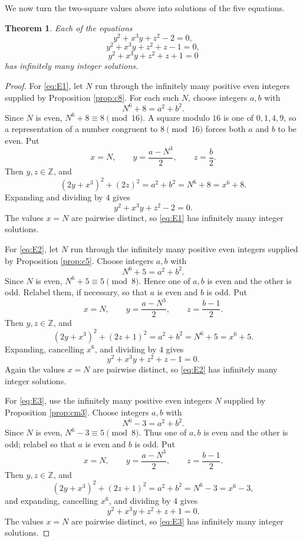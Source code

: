 \documentclass{article}
\theoremstyle{plain}
\theoremstyle{remark}
\theoremstyle{myconjecture}
\theoremstyle{plain}
\newtheorem{theorem}{Theorem}[section]
\theoremstyle{definition}
\numberwithin{equation}{section} %
\begin{document}
We now turn the two-square values above into solutions of the five equations.

\begin{theorem}\label{thm:first-three}
Each of the equations
\[
        y^2+x^3y+z^2-2=0,                    \tag{E1}\label{eq:E1}
\]
\[
        y^2+x^3y+z^2+z-1=0,                  \tag{E2}\label{eq:E2}
\]
\[
        y^2+x^3y+z^2+z+1=0                   \tag{E3}\label{eq:E3}
\]
has infinitely many integer solutions.
\end{theorem}

\begin{proof}
For \eqref{eq:E1}, let \(N\) run through the infinitely many positive even
integers supplied by Proposition \ref{prop:c8}.  For each such \(N\), choose
integers \(a,b\) with
\[
        N^6+8=a^2+b^2.
\]
Since \(N\) is even, \(N^6+8\equiv8\pmod {16}\).  A square modulo \(16\) is one
of \(0,1,4,9\), so a representation of a number congruent to \(8\pmod {16}\)
forces both \(a\) and \(b\) to be even.  Put
\[
        x=N,
        \qquad
        y=\frac{a-N^3}{2},
        \qquad
        z=\frac b2.
\]
Then \(y,z\in\mathbb Z\), and
\[
        (2y+x^3)^2+(2z)^2=a^2+b^2=N^6+8=x^6+8.
\]
Expanding and dividing by \(4\) gives
\[
        y^2+x^3y+z^2-2=0.
\]
The values \(x=N\) are pairwise distinct, so \eqref{eq:E1} has infinitely many
integer solutions.

For \eqref{eq:E2}, let \(N\) run through the infinitely many positive even
integers supplied by Proposition \ref{prop:c5}.  Choose integers \(a,b\) with
\[
        N^6+5=a^2+b^2.
\]
Since \(N\) is even, \(N^6+5\equiv5\pmod8\).  Hence one of \(a,b\) is even and
the other is odd.  Relabel them, if necessary, so that \(a\) is even and \(b\)
is odd.  Put
\[
        x=N,
        \qquad
        y=\frac{a-N^3}{2},
        \qquad
        z=\frac{b-1}{2}.
\]
Then \(y,z\in\mathbb Z\), and
\[
        (2y+x^3)^2+(2z+1)^2=a^2+b^2=N^6+5=x^6+5.
\]
Expanding, cancelling \(x^6\), and dividing by \(4\) gives
\[
        y^2+x^3y+z^2+z-1=0.
\]
Again the values \(x=N\) are pairwise distinct, so \eqref{eq:E2} has infinitely
many integer solutions.

For \eqref{eq:E3}, use the infinitely many positive even integers \(N\) supplied
by Proposition \ref{prop:cm3}.  Choose integers \(a,b\) with
\[
        N^6-3=a^2+b^2.
\]
Since \(N\) is even, \(N^6-3\equiv5\pmod8\).  Thus one of \(a,b\) is even and
the other is odd; relabel so that \(a\) is even and \(b\) is odd.  Put
\[
        x=N,
        \qquad
        y=\frac{a-N^3}{2},
        \qquad
        z=\frac{b-1}{2}.
\]
Then \(y,z\in\mathbb Z\), and
\[
        (2y+x^3)^2+(2z+1)^2=a^2+b^2=N^6-3=x^6-3,
\]
and expanding, cancelling \(x^6\), and dividing by \(4\) gives
\[
        y^2+x^3y+z^2+z+1=0.
\]
The values \(x=N\) are pairwise distinct, so \eqref{eq:E3} has infinitely many
integer solutions.
\end{proof}
\end{document}
